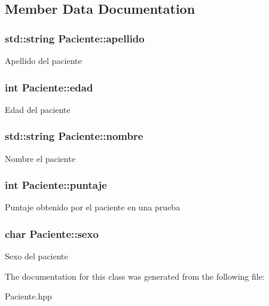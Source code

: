 \subsection{Member Data Documentation}
\hypertarget{class_paciente_adaa241cbab07b786730e27b82e303616}{
\subsubsection[{apellido}]{\setlength{\rightskip}{0pt plus 5cm}std\+::string Paciente\+::apellido}}\label{class_paciente_adaa241cbab07b786730e27b82e303616}
Apellido del paciente \hypertarget{class_paciente_a5a873f7b3df047548f58ec7a9d4ca29c}{
\subsubsection[{edad}]{\setlength{\rightskip}{0pt plus 5cm}int Paciente\+::edad}}\label{class_paciente_a5a873f7b3df047548f58ec7a9d4ca29c}
Edad del paciente \hypertarget{class_paciente_aa038dc802c746b2ceb990400aca1bf92}{
\subsubsection[{nombre}]{\setlength{\rightskip}{0pt plus 5cm}std\+::string Paciente\+::nombre}}\label{class_paciente_aa038dc802c746b2ceb990400aca1bf92}
Nombre el paciente \hypertarget{class_paciente_a42560c348305a28a57a59294294f59f8}{
\subsubsection[{puntaje}]{\setlength{\rightskip}{0pt plus 5cm}int Paciente\+::puntaje}}\label{class_paciente_a42560c348305a28a57a59294294f59f8}
Puntaje obtenido por el paciente en una prueba \hypertarget{class_paciente_aaf0b95139b3d6bf6f475b52050b8613c}{
\subsubsection[{sexo}]{\setlength{\rightskip}{0pt plus 5cm}char Paciente\+::sexo}}\label{class_paciente_aaf0b95139b3d6bf6f475b52050b8613c}
Sexo del paciente 

The documentation for this class was generated from the following file\+:\begin{DoxyCompactItemize}
\item 
Paciente.\+hpp\end{DoxyCompactItemize}
